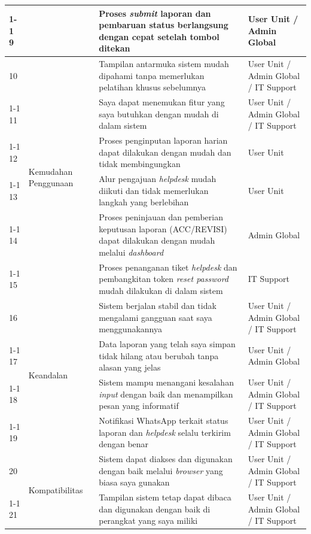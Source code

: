 \begin{longtable}{|p{}|p{}|p{}|p{}|}
    \cline{1-1}\cline{3-4}
    9 & & Proses \textit{submit} laporan dan pembaruan status berlangsung dengan cepat setelah tombol ditekan & User Unit / Admin Global \\
    \hline
    10 & \multirow{6}{=}{Kemudahan Penggunaan} & Tampilan antarmuka sistem mudah dipahami tanpa memerlukan pelatihan khusus sebelumnya & User Unit / Admin Global / IT Support \\
    \cline{1-1}\cline{3-4}
    11 & & Saya dapat menemukan fitur yang saya butuhkan dengan mudah di dalam sistem & User Unit / Admin Global / IT Support \\
    \cline{1-1}\cline{3-4}
    12 & & Proses penginputan laporan harian dapat dilakukan dengan mudah dan tidak membingungkan & User Unit \\
    \cline{1-1}\cline{3-4}
    13 & & Alur pengajuan \textit{helpdesk} mudah diikuti dan tidak memerlukan langkah yang berlebihan & User Unit \\
    \cline{1-1}\cline{3-4}
    14 & & Proses peninjauan dan pemberian keputusan laporan (ACC/REVISI) dapat dilakukan dengan mudah melalui \textit{dashboard} & Admin Global \\
    \cline{1-1}\cline{3-4}
    15 & & Proses penanganan tiket \textit{helpdesk} dan pembangkitan token \textit{reset password} mudah dilakukan di dalam sistem & IT Support \\
    \hline
    16 & \multirow{4}{=}{Keandalan} & Sistem berjalan stabil dan tidak mengalami gangguan saat saya menggunakannya & User Unit / Admin Global / IT Support \\
    \cline{1-1}\cline{3-4}
    17 & & Data laporan yang telah saya simpan tidak hilang atau berubah tanpa alasan yang jelas & User Unit / Admin Global \\
    \cline{1-1}\cline{3-4}
    18 & & Sistem mampu menangani kesalahan \textit{input} dengan baik dan menampilkan pesan yang informatif & User Unit / Admin Global / IT Support \\
    \cline{1-1}\cline{3-4}
    19 & & Notifikasi WhatsApp terkait status laporan dan \textit{helpdesk} selalu terkirim dengan benar & User Unit / Admin Global / IT Support \\
    \hline
    20 & \multirow{3}{=}{Kompatibilitas} & Sistem dapat diakses dan digunakan dengan baik melalui \textit{browser} yang biasa saya gunakan & User Unit / Admin Global / IT Support \\
    \cline{1-1}\cline{3-4}
    21 & & Tampilan sistem tetap dapat dibaca dan digunakan dengan baik di perangkat yang saya miliki & User Unit / Admin Global / IT Support \\

\end{longtable}
